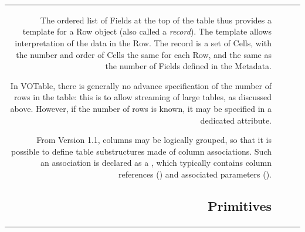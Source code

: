 \begin{tabular}{RRCp{0.8\textwidth}}
\mbox{}{\color{black}}%
%
The ordered list of Fields at the top of the table thus provides a
template for a Row object (also called a {\it record}). The
template allows interpretation of the data in the Row. 
The
record is a set of Cells, with the number and order of Cells the same for each
Row, and the same as the number of Fields defined in the Metadata.

In VOTable,
there is generally no advance specification of the number of rows in the table:
this is to allow streaming of large tables, as discussed above.
However, if the number of rows is known, it may be specified in a
dedicated  attribute.

From Version 1.1, columns may be logically grouped, so that it is
possible to define table substructures made of column associations.
Such an association is declared as a , which typically
contains column references () 
and associated parameters ().

\subsection{Primitives}


\end{tabular}
